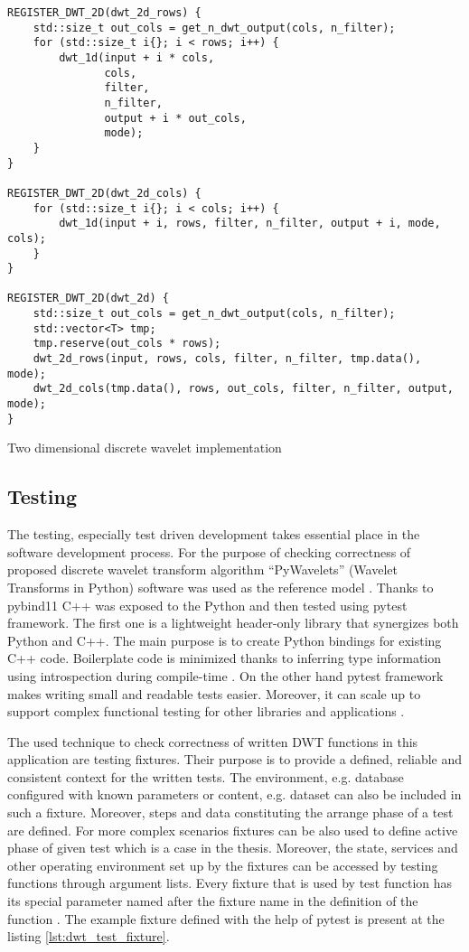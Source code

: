 \begin{listing}[!htb]
\begin{verbatim}
REGISTER_DWT_2D(dwt_2d_rows) {
    std::size_t out_cols = get_n_dwt_output(cols, n_filter);
    for (std::size_t i{}; i < rows; i++) {
        dwt_1d(input + i * cols,
               cols,
               filter,
               n_filter,
               output + i * out_cols,
               mode);
    }
}

REGISTER_DWT_2D(dwt_2d_cols) {
    for (std::size_t i{}; i < cols; i++) {
        dwt_1d(input + i, rows, filter, n_filter, output + i, mode, cols);
    }
}

REGISTER_DWT_2D(dwt_2d) {
    std::size_t out_cols = get_n_dwt_output(cols, n_filter);
    std::vector<T> tmp;
    tmp.reserve(out_cols * rows);
    dwt_2d_rows(input, rows, cols, filter, n_filter, tmp.data(), mode);
    dwt_2d_cols(tmp.data(), rows, out_cols, filter, n_filter, output, mode);
}
\end{verbatim}
\caption{Two dimensional discrete wavelet implementation}
\label{lst:dwt_interface}
\end{listing}

\subsection{Testing}

The testing, especially test driven development takes essential place in the software development
process. For the purpose of checking correctness of proposed discrete wavelet transform algorithm
``PyWavelets'' (Wavelet Transforms in Python) software was used as the reference model \cite{pywavelets}.
Thanks to pybind11 \cite{pybind11} C++ was exposed to the Python and then tested using pytest framework.
The first one is a lightweight header-only library that synergizes both Python and C++. The main purpose
is to create Python bindings for existing C++ code. Boilerplate code is minimized thanks to inferring
type information using introspection during compile-time \cite{pywavelets}. On the other hand pytest framework makes
writing small and readable tests easier. Moreover, it can scale up to support complex functional
testing for other libraries and applications \cite{pytest}.

The used technique to check correctness of written DWT functions in this application are testing
fixtures. Their purpose is to provide a defined, reliable and consistent context for the written tests.
The environment, e.g. database configured with known parameters or content, e.g. dataset can also
be included in such a fixture. Moreover, steps and data constituting the arrange phase of a test
are defined. For more complex scenarios fixtures can be also used to define active phase 
of given test which is a case in the thesis. Moreover, the state, services and other operating
environment set up by the fixtures can be accessed by testing functions through argument lists.
Every fixture that is used by test function has its special parameter named after the fixture name
in the definition of the function \cite{pytest}. The example fixture defined with the help
of pytest is present at the listing \ref{lst:dwt_test_fixture}.

